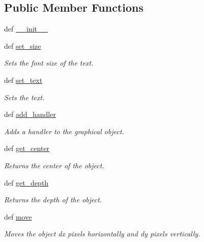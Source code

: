 \subsection*{Public Member Functions}
\begin{DoxyCompactItemize}
\item 
def \hyperlink{classcs110graphics_1_1Text_a022ce78a2945edbd8dfe3c4498769a62}{\_\-\_\-init\_\-\_\-}
\item 
def \hyperlink{classcs110graphics_1_1Text_ad470aa26235fc2f5f1459c3750251207}{set\_\-size}
\begin{DoxyCompactList}\small\item\em Sets the font size of the text. \item\end{DoxyCompactList}\item 
def \hyperlink{classcs110graphics_1_1Text_ab12aa7478ca6a2b2015b7e8544674c73}{set\_\-text}
\begin{DoxyCompactList}\small\item\em Sets the text. \item\end{DoxyCompactList}\item 
def \hyperlink{classcs110graphics_1_1GraphicalObject_adb1af0d5a6baae3f9a08d21a3227c49f}{add\_\-handler}
\begin{DoxyCompactList}\small\item\em Adds a handler to the graphical object. \item\end{DoxyCompactList}\item 
def \hyperlink{classcs110graphics_1_1GraphicalObject_a062789c4cc9de38af32dcc4ff2058607}{get\_\-center}
\begin{DoxyCompactList}\small\item\em Returns the center of the object. \item\end{DoxyCompactList}\item 
def \hyperlink{classcs110graphics_1_1GraphicalObject_a6d9f5718cd0cf249e0d2842971bae17f}{get\_\-depth}
\begin{DoxyCompactList}\small\item\em Returns the depth of the object. \item\end{DoxyCompactList}\item 
def \hyperlink{classcs110graphics_1_1GraphicalObject_aa64d270fb83efa4a54e1a7953512f9cd}{move}
\begin{DoxyCompactList}\small\item\em Moves the object dx pixels horizontally and dy pixels vertically. \item\end{DoxyCompactList}\item 

\end{DoxyCompactItemize}

